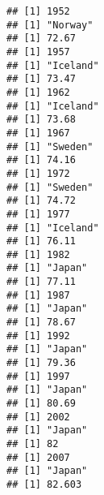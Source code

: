 \documentclass[
]{article}
\newenvironment{Shaded}{\begin{snugshade}}{\end{snugshade}}
\newcommand{\ControlFlowTok}[1]{\textcolor[rgb]{0.13,0.29,0.53}{\textbf{#1}}}
\newcommand{\DecValTok}[1]{\textcolor[rgb]{0.00,0.00,0.81}{#1}}
\newcommand{\FunctionTok}[1]{\textcolor[rgb]{0.00,0.00,0.00}{#1}}
\newcommand{\NormalTok}[1]{#1}
\newcommand{\OtherTok}[1]{\textcolor[rgb]{0.56,0.35,0.01}{#1}}
\newcommand{\SpecialCharTok}[1]{\textcolor[rgb]{0.00,0.00,0.00}{#1}}
\begin{document}
\begin{Shaded}
\end{Shaded}

\begin{verbatim}
## [1] 1952
## [1] "Norway"
## [1] 72.67
## [1] 1957
## [1] "Iceland"
## [1] 73.47
## [1] 1962
## [1] "Iceland"
## [1] 73.68
## [1] 1967
## [1] "Sweden"
## [1] 74.16
## [1] 1972
## [1] "Sweden"
## [1] 74.72
## [1] 1977
## [1] "Iceland"
## [1] 76.11
## [1] 1982
## [1] "Japan"
## [1] 77.11
## [1] 1987
## [1] "Japan"
## [1] 78.67
## [1] 1992
## [1] "Japan"
## [1] 79.36
## [1] 1997
## [1] "Japan"
## [1] 80.69
## [1] 2002
## [1] "Japan"
## [1] 82
## [1] 2007
## [1] "Japan"
## [1] 82.603
\end{verbatim}
\end{document}
